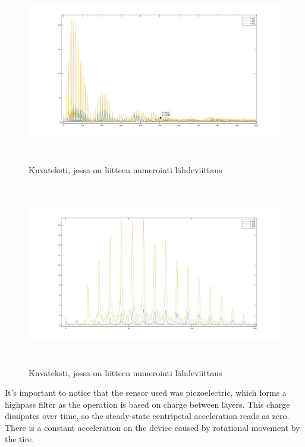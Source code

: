 \begin{figure}[htb]
\begin{center}
\includegraphics[height=8cm]{images/FFT-80}
\end{center}
\caption{Kuvateksti, jossa on liitteen numerointi {\color{red}l\"ahdeviittaus}}
\label{liitekuva}
\end{figure}

\begin{figure}[htb]
\begin{center}
\includegraphics[height=8cm]{images/FFT-80-zoom}
\end{center}
\caption{Kuvateksti, jossa on liitteen numerointi {\color{red}l\"ahdeviittaus}}
\label{liitekuva}
\end{figure}

It's important to notice that the sensor used was piezoelectric, which forms a highpass filter as the operation is based on charge between layers. This charge dissipates over time, so the steady-state centripetal acceleration reads as zero. There is a constant acceleration on the device caused by rotational movement by the tire. 


